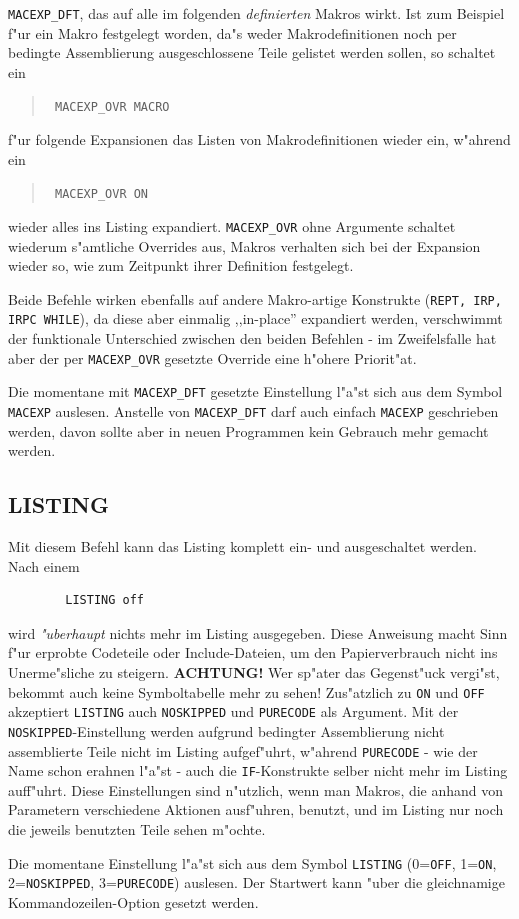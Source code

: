 \documentclass[12pt,a4paper,twoside]{report}
\makeatletter
\newcommand{\ii}[1]{{\it #1}}
\newcommand{\bb}[1]{{\bf #1}}
\newcommand{\tty}[1]{{\tt #1}}
\newcommand{\ttindex}[1]{\index{#1@{\tt #1}}}
\makeatother
\begin{document}
\tty{MACEXP\_DFT}, das auf alle im folgenden {\em definierten} Makros
wirkt.  Ist zum Beispiel f"ur ein Makro festgelegt worden, da"s weder
Makrodefinitionen noch per bedingte Assemblierung ausgeschlossene
Teile gelistet werden sollen, so schaltet ein
\begin{quote}{\tt
	MACEXP\_OVR  MACRO
}\end{quote}
f"ur folgende Expansionen das Listen von Makrodefinitionen wieder ein,
w"ahrend ein
\begin{quote}{\tt
	MACEXP\_OVR ON
}\end{quote}
wieder alles ins Listing expandiert.  \tty{MACEXP\_OVR} ohne
Argumente schaltet wiederum s"amtliche Overrides aus, Makros
verhalten sich bei der Expansion wieder so, wie zum Zeitpunkt ihrer
Definition festgelegt.
\par
Beide Befehle wirken ebenfalls auf andere Makro-artige Konstrukte
(\tty{REPT, IRP, IRPC WHILE}), da diese aber einmalig ,,in-place''
expandiert werden, verschwimmt der funktionale Unterschied zwischen
den beiden Befehlen - im Zweifelsfalle hat aber der per
\tty{MACEXP\_OVR} gesetzte Override eine h"ohere Priorit"at.

Die momentane mit \tty{MACEXP\_DFT} gesetzte Einstellung l"a"st sich
aus dem Symbol \tty{MACEXP} auslesen.  Anstelle von \tty{MACEXP\_DFT}
darf auch einfach \tty{MACEXP} geschrieben werden, davon sollte aber
in neuen Programmen kein Gebrauch mehr gemacht werden.


\subsection{LISTING}
\ttindex{LISTING}\label{SectListingCmd}

Mit diesem Befehl kann das Listing komplett ein- und ausgeschaltet
werden. Nach einem
\begin{verbatim}
        LISTING off
\end{verbatim}
wird \ii{"uberhaupt} nichts mehr im Listing ausgegeben.  Diese Anweisung
macht Sinn f"ur erprobte Codeteile oder Include-Dateien, um den
Papierverbrauch nicht ins Unerme"sliche zu steigern.  \bb{ACHTUNG!}
Wer sp"ater das Gegenst"uck vergi"st, bekommt auch keine Symboltabelle
mehr zu sehen!  Zus"atzlich zu \tty{ON} und \tty{OFF} akzeptiert
\tty{LISTING} auch \tty{NOSKIPPED} und \tty{PURECODE} als Argument.  Mit
der \tty{NOSKIPPED}-Einstellung werden aufgrund bedingter Assemblierung
nicht assemblierte Teile nicht im Listing aufgef"uhrt, w"ahrend
\tty{PURECODE} - wie der Name schon erahnen l"a"st - auch die
\tty{IF}-Konstrukte selber nicht mehr im Listing auff"uhrt.  Diese
Einstellungen sind n"utzlich, wenn man Makros, die anhand von
Parametern verschiedene Aktionen ausf"uhren, benutzt, und im Listing
nur noch die jeweils benutzten Teile sehen m"ochte.
\par
Die momentane Einstellung l"a"st sich aus dem Symbol \tty{LISTING}
(0=\tty{OFF}, 1=\tty{ON}, 2=\tty{NOSKIPPED}, 3=\tty{PURECODE}) auslesen.
Der Startwert kann "uber die gleichnamige Kommandozeilen-Option
gesetzt werden.
\end{document}
